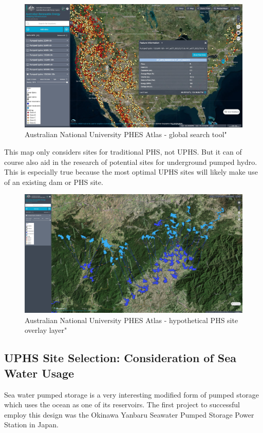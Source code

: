 \documentclass[hidelinks,12pt,a4paper]{article}
\begin{document}
\begin{figure}[ht!]
    \centering
    \includegraphics[width=1\textwidth]{australian-national-university-global-phes-atlas.jpg}
    \caption{Australian National University PHES Atlas - global search tool" \cite{AustralianNationalUniversityGlobalPHESAtlas}}
\end{figure}
\FloatBarrier

This map only considers sites for traditional PHS, not UPHS. But it can of course also aid in the research of potential sites for underground pumped hydro. This is especially true because the most optimal UPHS sites will likely make use of an existing dam or PHS site.

\begin{figure}[ht!]
    \centering
    \includegraphics[width=1\textwidth]{australian-national-university-global-phes-atlas-water-overlay.png}
    \caption{Australian National University PHES Atlas - hypothetical PHS site overlay layer" \cite{AustralianNationalUniversityGlobalPHESAtlas}}
\end{figure}
\FloatBarrier

\subsection{UPHS Site Selection: Consideration of Sea Water Usage}
Sea water pumped storage is a very interesting modified form of pumped storage which uses the ocean as one of its reservoirs. The first project to successful employ this design was the Okinawa Yanbaru Seawater Pumped Storage Power Station in Japan. \cite{SeaWaterPumpedStoragePowerPlant}
\end{document}
